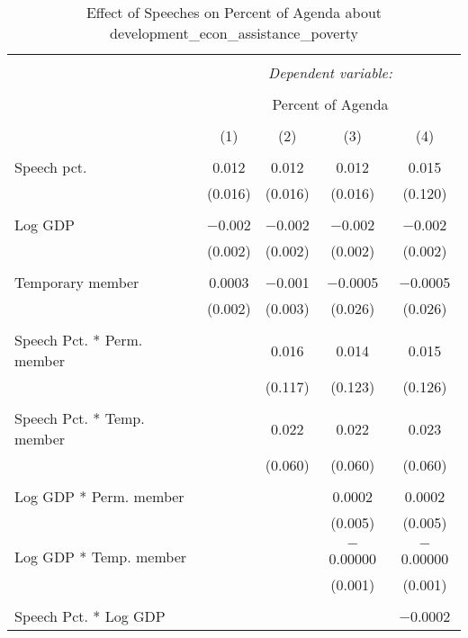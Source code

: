 
\begin{table}[!htbp] \centering 
  \caption{Effect of Speeches on Percent of Agenda about  development_econ_assistance_poverty} 
  \label{} 
\begin{tabular}{@{\extracolsep{5pt}}lcccc} 
\\[-1.8ex]\hline 
\hline \\[-1.8ex] 
 & \multicolumn{4}{c}{\textit{Dependent variable:}} \\ 
\cline{2-5} 
\\[-1.8ex] & \multicolumn{4}{c}{Percent of Agenda} \\ 
\\[-1.8ex] & (1) & (2) & (3) & (4)\\ 
\hline \\[-1.8ex] 
 Speech pct. & 0.012 & 0.012 & 0.012 & 0.015 \\ 
  & (0.016) & (0.016) & (0.016) & (0.120) \\ 
  & & & & \\ 
 Log GDP & $-$0.002 & $-$0.002 & $-$0.002 & $-$0.002 \\ 
  & (0.002) & (0.002) & (0.002) & (0.002) \\ 
  & & & & \\ 
 Temporary member & 0.0003 & $-$0.001 & $-$0.0005 & $-$0.0005 \\ 
  & (0.002) & (0.003) & (0.026) & (0.026) \\ 
  & & & & \\ 
 Speech Pct. * Perm. member &  & 0.016 & 0.014 & 0.015 \\ 
  &  & (0.117) & (0.123) & (0.126) \\ 
  & & & & \\ 
 Speech Pct. * Temp. member &  & 0.022 & 0.022 & 0.023 \\ 
  &  & (0.060) & (0.060) & (0.060) \\ 
  & & & & \\ 
 Log GDP * Perm. member &  &  & 0.0002 & 0.0002 \\ 
  &  &  & (0.005) & (0.005) \\ 
  & & & & \\ 
 Log GDP * Temp. member &  &  & $-$0.00000 & $-$0.00000 \\ 
  &  &  & (0.001) & (0.001) \\ 
  & & & & \\ 
 Speech Pct. * Log GDP &  &  &  & $-$0.0002 \\ 

\end{tabular}
\end{table}
